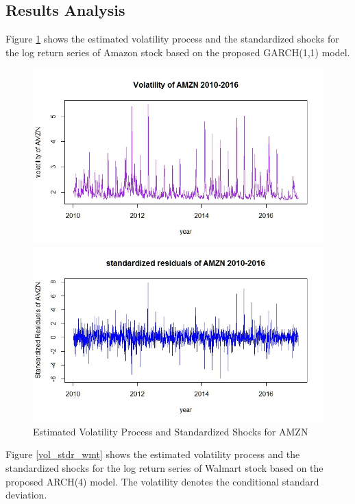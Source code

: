 \documentclass[paper=a4, fontsize=11pt]{article}
\begin{document}
\subsection{Results Analysis}
Figure \ref{vol_stdr_amzn} shows the estimated volatility process and the standardized shocks for the log return series of Amazon stock based on the proposed GARCH(1,1) model.

\begin{figure}[!htbp]
\begin{minipage}[!htbp]{0.5\linewidth}
\centering
\includegraphics[scale = 0.45]{img/vol_AMZN}
\end{minipage}
\begin{minipage}[!htbp]{0.5\linewidth}
\centering
\includegraphics[scale = 0.45]{img/stdr_AMZN}
\end{minipage}
\caption{Estimated Volatility Process and Standardized Shocks for AMZN}
\label{vol_stdr_amzn}
\end{figure}

Figure \ref{vol_stdr_wmt} shows the estimated volatility process and the standardized shocks for the log return series of Walmart stock based on the proposed ARCH(4) model. The volatility denotes the conditional standard deviation.
\end{document}
